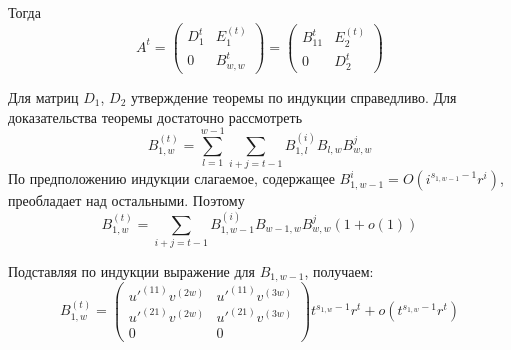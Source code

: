 \documentclass[11pt]{article}
\begin{document}
Тогда
\begin{equation}
    A^t = 
    \begin{pmatrix}
        D_1^t & E_1^{(t)} \\
        0 & B_{w,w}^t
    \end{pmatrix}
    =
    \begin{pmatrix}
        B_{11}^t & E_2^{(t)} \\
        0 & D_2^t
    \end{pmatrix}
\end{equation}

Для матриц $D_1$, $D_2$ утверждение теоремы по индукции справедливо. Для доказательства теоремы достаточно рассмотреть
\begin{equation}
    B_{1,w}^{(t)} = \sum_{l = 1}^{w-1} \sum_{i + j = t-1} B_{1,l}^{(i)} B_{l,w} B_{w,w}^j
\end{equation}
По предположению индукции слагаемое, содержащее $B_{1,w-1}^i = O(i^{s_{1,w-1} - 1} r^i)$, преобладает над остальными. Поэтому
\begin{equation}
    B_{1,w}^{(t)} = \sum_{i + j = t-1} B_{1,w-1}^{(i)} B_{w-1,w} B_{w,w}^j (1 + o(1))
\end{equation}

Подставляя по индукции выражение для $B_{1,w-1}$, получаем:
\begin{equation}
    B_{1,w}^{(t)} = 
    \begin{pmatrix}
        u'^{(11)} v^{(2w)} & u'^{(11)} v^{(3w)} \\
        u'^{(21)} v^{(2w)} & u'^{(21)} v^{(3w)} \\
        0 & 0
    \end{pmatrix}
    t^{s_{1,w} - 1} r^t + o(t^{s_{1,w}-1} r^t)
\end{equation}
\end{document}

